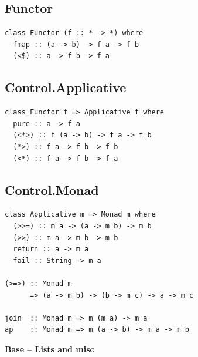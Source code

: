 \begin{multicols}{2}

\begin{box1}
\subsection *{Functor}

\begin{verbatim}
class Functor (f :: * -> *) where
  fmap :: (a -> b) -> f a -> f b
  (<$) :: a -> f b -> f a
\end{verbatim}
\end{box1}

\begin{box2}
\subsection *{Control.Applicative}
\begin{verbatim}
class Functor f => Applicative f where
  pure :: a -> f a
  (<*>) :: f (a -> b) -> f a -> f b
  (*>) :: f a -> f b -> f b
  (<*) :: f a -> f b -> f a
\end{verbatim}
\end{box2}

\begin{box1}
\subsection *{Control.Monad}
\begin{verbatim}
class Applicative m => Monad m where
  (>>=) :: m a -> (a -> m b) -> m b
  (>>) :: m a -> m b -> m b
  return :: a -> m a
  fail :: String -> m a

(>=>) :: Monad m
      => (a -> m b) -> (b -> m c) -> a -> m c

join  :: Monad m => m (m a) -> m a
ap    :: Monad m => m (a -> b) -> m a -> m b
\end{verbatim}

\end{box1}

\end{multicols}
\newpage

{\huge \bfseries Base -- Lists and misc \\[0.2cm]}

\HRule%

